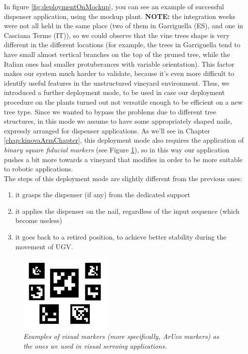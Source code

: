 \begin{enumerate}
 	In figure \ref{fig:deploymentOnMockup}, you can see an example of successful dispenser application, using the mockup plant. \textbf{NOTE:} the integration weeks were not all held in the same place (two of them in Garriguella (ES), and one in Casciana Terme (IT)), so we could observe that the vine trees shape is very different in the different locations (for example, the trees in Garriguella tend to have small almost vertical branches on the top of the pruned tree, while the Italian ones had smaller protuberances with variable orientation). This factor makes our system much harder to validate, because it's even more difficult to identify useful features in the unstructured vineyard environment. Thus, we introduced a further deployment mode, to be used in case our deployment procedure on the plants turned out not versatile enough to be efficient on a new tree type. Since we wanted to bypass the problems due to different tree structures, in this mode we assume to have some appropriately shaped nails, expressly arranged for dispenser applications. As we'll see in Chapter \ref{chap:kinovaArmChapter}, this deployment mode also requires the application of \textit{binary square fiducial markers} (see Figure \ref{fig:arucoMarkers}), so in this way our application pushes a bit more towards a vineyard that modifies in order to be more suitable to robotic applications.\\
 	The steps of this deployment mode are slightly different from the previous ones:
 	\begin{enumerate}
 		\item it grasps the dispenser (if any) from the dedicated support
 		\item it applies the dispenser on the nail, regardless of the input sequence (which become useless)
 		\item it goes back to a retired position, to achieve better stability during the movement of \ac{UGV}.
 	\end{enumerate}
 \end{enumerate}

\begin{figure}
	\centering
	\includegraphics[width=0.4\textwidth]{Images/grape_sw_hw_architecture/arucoMarkers.png}
	\caption{\textit{Examples of visual markers (more specifically, ArUco markers) as the ones we used in visual servoing applications.}}
	\label{fig:arucoMarkers}
\end{figure}

